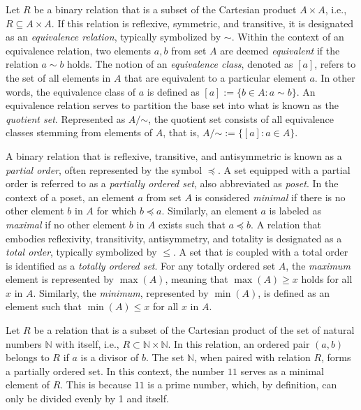 Let $R$ be a binary relation that is a subset of the Cartesian product $A \times A$, i.e., $R \subseteq A \times A$. If this relation is reflexive, symmetric, and transitive, it is designated as an \emph{equivalence relation}, typically symbolized by $\sim$. Within the context of an equivalence relation, two elements $a, b$ from set $A$ are deemed \emph{equivalent} if the relation $a \sim b$ holds. The notion of an \emph{equivalence class}, denoted as $[a]$, refers to the set of all elements in $A$ that are equivalent to a particular element $a$. In other words, the equivalence class of $a$ is defined as $[a] := \{ b \in A : a \sim b\}$. An equivalence relation serves to partition the base set into what is known as the \emph{quotient set}. Represented as $A / {\mathord {\sim }}$, the quotient set consists of all equivalence classes stemming from elements of $A$, that is, $A / {\mathord {\sim }} := \{ [a] : a \in A \}$.

A binary relation that is reflexive, transitive, and antisymmetric is known as a \emph{partial order}, often represented by the symbol $\preceq$. A set equipped with a partial order is referred to as a \emph{partially ordered set}, also abbreviated as \emph{poset}. In the context of a poset, an element $a$ from set $A$ is considered \emph{minimal} if there is no other element $b$ in $A$ for which $b \preceq a$. Similarly, an element $a$ is labeled as \emph{maximal} if no other element $b$ in $A$ exists such that $a \preceq b$. A relation that embodies reflexivity, transitivity, antisymmetry, and totality is designated as a \emph{total order}, typically symbolized by $\leq$. A set that is coupled with a total order is identified as a \emph{totally ordered set}. For any totally ordered set $A$, the \emph{maximum} element is represented by $\max(A)$, meaning that $\max(A) \geq x$ holds for all $x$ in $A$. Similarly, the \emph{minimum}, represented by $\min(A)$, is defined as an element such that $\min(A) \leq x$ for all $x$ in $A$.

\begin{example}
Let $R$ be a relation that is a subset of the Cartesian product of the set of natural numbers $\mathbb{N}$ with itself, i.e., $R \subset \mathbb{N} \times \mathbb{N}$. In this relation, an ordered pair $(a, b)$ belongs to $R$ if $a$ is a divisor of $b$. The set $\mathbb{N}$, when paired with relation $R$, forms a partially ordered set. In this context, the number $11$ serves as a minimal element of $R$. This is because $11$ is a prime number, which, by definition, can only be divided evenly by 1 and itself.
\end{example}

